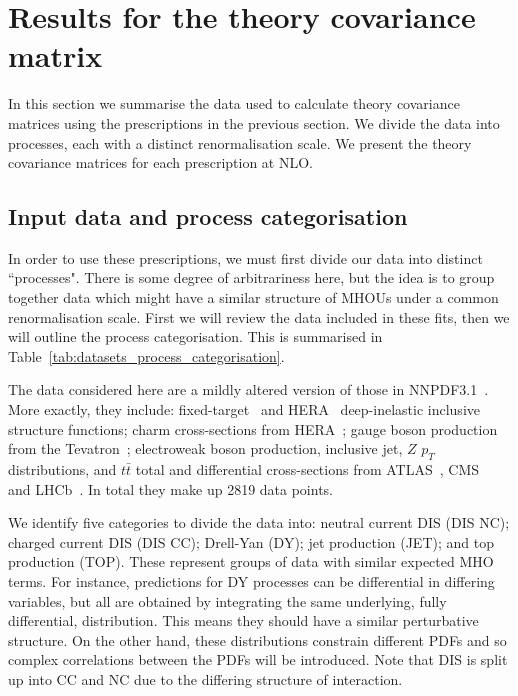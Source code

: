 \section{Results for the theory covariance matrix}
\label{sec:results}
In this section we summarise the data used to calculate theory covariance matrices using the prescriptions in the previous section. We divide the data into processes, each with a distinct renormalisation scale. We present the theory covariance matrices for each prescription at NLO.

\subsection{Input data and process categorisation}
In order to use these prescriptions, we must first divide our data into distinct ``processes". There is some degree of arbitrariness here, but the idea is to group together data which might have a similar structure of MHOUs under a common renormalisation scale. First we will review the data included in these fits, then we will outline the process categorisation. This is summarised in Table~\ref{tab:datasets_process_categorisation}.

The data considered here are a mildly altered version of those in NNPDF3.1~\cite{Ball:2017nwa}. More exactly, they include: fixed-target~\cite{Arneodo:1996kd,Arneodo:1996qe,
Whitlow:1991uw,bcdms1,bcdms2,Goncharov:2001qe,MasonPhD,Onengut:2005kv} 
and HERA~\cite{Abramowicz:2015mha} deep-inelastic inclusive structure functions;
charm cross-sections from HERA~\cite{Abramowicz:1900rp};
gauge boson production from the Tevatron~\cite{Aaltonen:2010zza,Abazov:2007jy,
D0:2014kma,Abazov:2013rja}; electroweak boson production, 
inclusive jet, $Z$ $p_T$ distributions, and $t\bar{t}$ total and differential
cross-sections from ATLAS~\cite{Aad:2011dm,Aaboud:2016btc,Aad:2014qja,
Aad:2013iua,Aad:2015auj,Aad:2011fc,Aad:2014kva,Aaboud:2016pbd,Aad:2015mbv},
CMS~\cite{Chatrchyan:2013tia,Chatrchyan:2012xt,Chatrchyan:2013mza,
Khachatryan:2016pev,Khachatryan:2015oaa,Chatrchyan:2012bja,Khachatryan:2016mqs, 
Khachatryan:2015uqb,Khachatryan:2015oqa} 
and LHCb~\cite{Aaij:2012vn,Aaij:2012mda,Aaij:2015gna,Aaij:2015zlq}. In total they make up 2819 data points.
  

We identify five categories to divide the data into: neutral current DIS (DIS NC); charged current DIS (DIS CC); Drell-Yan (DY); jet production (JET); and top production (TOP). These represent groups of data with similar expected MHO terms. For instance, predictions for DY processes can be differential in differing variables, but all are obtained by integrating the same underlying, fully differential, distribution. This means they should have a similar perturbative structure. On the other hand, these distributions constrain different PDFs and so complex correlations between the PDFs will be introduced. Note that DIS is split up into CC and NC due to the differing structure of interaction.

